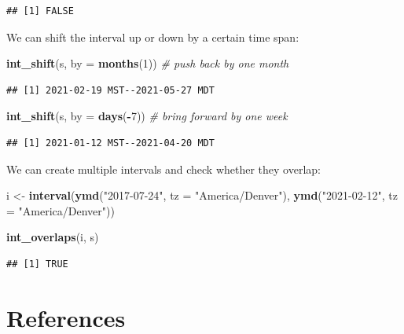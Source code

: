 \documentclass[
]{book}
\newenvironment{Shaded}{\begin{snugshade}}{\end{snugshade}}
\newcommand{\AttributeTok}[1]{\textcolor[rgb]{0.13,0.29,0.53}{#1}}
\newcommand{\CommentTok}[1]{\textcolor[rgb]{0.56,0.35,0.01}{\textit{#1}}}
\newcommand{\DecValTok}[1]{\textcolor[rgb]{0.00,0.00,0.81}{#1}}
\newcommand{\FunctionTok}[1]{\textcolor[rgb]{0.13,0.29,0.53}{\textbf{#1}}}
\newcommand{\NormalTok}[1]{#1}
\newcommand{\OtherTok}[1]{\textcolor[rgb]{0.56,0.35,0.01}{#1}}
\newcommand{\SpecialCharTok}[1]{\textcolor[rgb]{0.81,0.36,0.00}{\textbf{#1}}}
\newcommand{\StringTok}[1]{\textcolor[rgb]{0.31,0.60,0.02}{#1}}
\begin{document}
\begin{verbatim}
## [1] FALSE
\end{verbatim}

We can shift the interval up or down by a certain time span:

\begin{Shaded}
\begin{Highlighting}[]
\FunctionTok{int\_shift}\NormalTok{(s, }\AttributeTok{by =} \FunctionTok{months}\NormalTok{(}\DecValTok{1}\NormalTok{)) }\CommentTok{\# push back by one month}
\end{Highlighting}
\end{Shaded}

\begin{verbatim}
## [1] 2021-02-19 MST--2021-05-27 MDT
\end{verbatim}

\begin{Shaded}
\begin{Highlighting}[]
\FunctionTok{int\_shift}\NormalTok{(s, }\AttributeTok{by =} \FunctionTok{days}\NormalTok{(}\SpecialCharTok{{-}}\DecValTok{7}\NormalTok{)) }\CommentTok{\# bring forward by one week}
\end{Highlighting}
\end{Shaded}

\begin{verbatim}
## [1] 2021-01-12 MST--2021-04-20 MDT
\end{verbatim}

We can create multiple intervals and check whether they overlap:

\begin{Shaded}
\begin{Highlighting}[]
\NormalTok{i }\OtherTok{\textless{}{-}} \FunctionTok{interval}\NormalTok{(}\FunctionTok{ymd}\NormalTok{(}\StringTok{"2017{-}07{-}24"}\NormalTok{, }\AttributeTok{tz =} \StringTok{"America/Denver"}\NormalTok{), }\FunctionTok{ymd}\NormalTok{(}\StringTok{"2021{-}02{-}12"}\NormalTok{, }\AttributeTok{tz =} \StringTok{"America/Denver"}\NormalTok{))}

\FunctionTok{int\_overlaps}\NormalTok{(i, s)}
\end{Highlighting}
\end{Shaded}

\begin{verbatim}
## [1] TRUE
\end{verbatim}

\hypertarget{references-9}{%
\section{References}\label{references-9}}
\end{document}
